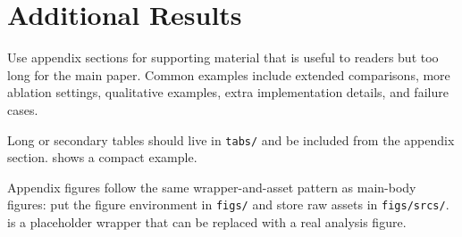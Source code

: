 \section{Additional Results}
\label{sec:app_additional_results}

Use appendix sections for supporting material that is useful to readers but too
long for the main paper. Common examples include extended comparisons, more
ablation settings, qualitative examples, extra implementation details, and
failure cases.

Long or secondary tables should live in \texttt{tabs/} and be included from the
appendix section.  shows a compact example.



Appendix figures follow the same wrapper-and-asset pattern as main-body figures:
put the figure environment in \texttt{figs/} and store raw assets in
\texttt{figs/srcs/}.  is a placeholder wrapper that
can be replaced with a real analysis figure.


